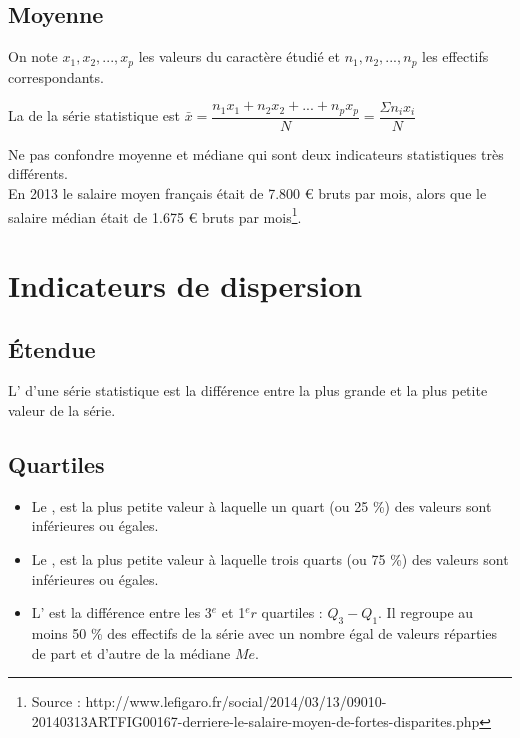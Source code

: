\documentclass[12pt,a4paper]{article}
\begin{document}


\subsection{Moyenne}

\begin{mydef}
	On note $x_1, x_2, ..., x_p$ les valeurs du caractère étudié et $n_1, n_2, ...,n_p$ les effectifs correspondants.
	
	La  de la série statistique est $\bar{x} = \dfrac{n_1x_1 + n_2x_2 + ... + n_px_p}{N} = \dfrac{\Sigma n_ix_i}{N} $
	
\end{mydef}



\begin{mywarning}
	Ne pas confondre moyenne et médiane qui sont deux indicateurs statistiques très différents.\\
	
	
	En 2013 le salaire moyen français était de 7.800 € bruts par mois, alors que le salaire médian était de 1.675 € bruts par mois\footnote{Source : http://www.lefigaro.fr/social/2014/03/13/09010-20140313ARTFIG00167-derriere-le-salaire-moyen-de-fortes-disparites.php}.
\end{mywarning}

\section{Indicateurs de dispersion}

\subsection{\'Etendue}
	
	\begin{mydef}
		L' d'une série statistique est la différence entre la plus grande et la plus petite valeur de la série.
	\end{mydef}	

	

\subsection{Quartiles}

\begin{mydef}
	\begin{itemize}
		\item Le , est la plus petite valeur à laquelle un quart (ou 25 \%) des valeurs sont inférieures ou égales.
		\item Le , est la plus petite valeur à laquelle trois quarts (ou 75 \%) des valeurs sont inférieures ou égales.
		\item L' est la différence entre les 3$^e$ et 1$^er$ quartiles : $Q_3 - Q_1$. Il regroupe au moins 50 \% des effectifs de la série avec un nombre égal de valeurs réparties de part et d'autre de la médiane $Me$.
	\end{itemize}
	 
\end{mydef}	
\end{document}
